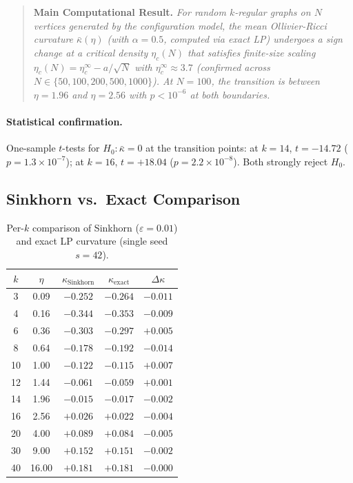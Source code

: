 \documentclass[12pt]{article}
\newcommand{\kbar}{\bar{\kappa}}
\newcommand{\etac}{\eta_c}
\begin{document}
\begin{quotation}
\noindent\textbf{Main Computational Result.} \emph{For random $k$-regular graphs on $N$
vertices generated by the configuration model, the mean Ollivier-Ricci curvature
$\kbar(\eta)$ (with $\alpha = 0.5$, computed via exact LP) undergoes a sign change at a
critical density $\etac(N)$ that satisfies finite-size scaling $\etac(N) = \etac^\infty -
a/\sqrt{N}$ with $\etac^\infty \approx 3.7$ (confirmed across $N \in \{50, 100, 200, 500,
1000\}$). At $N = 100$, the transition is between $\eta = 1.96$ and $\eta = 2.56$ with
$p < 10^{-6}$ at both boundaries.}
\end{quotation}

\paragraph{Statistical confirmation.} One-sample $t$-tests for $H_0\colon \kbar = 0$ at
the transition points: at $k = 14$, $t = -14.72$ ($p = 1.3\times 10^{-7}$); at $k = 16$,
$t = +18.04$ ($p = 2.2\times 10^{-8}$). Both strongly reject $H_0$.

\subsection{Sinkhorn vs.\ Exact Comparison}

\begin{table}[ht]
\centering
\caption{Per-$k$ comparison of Sinkhorn ($\varepsilon = 0.01$) and exact LP curvature
(single seed $s = 42$).}
\label{tab:sinkhorn}
\begin{tabular}{cc ccc}
\toprule
$k$ & $\eta$ & $\kappa_{\mathrm{Sinkhorn}}$ & $\kappa_{\mathrm{exact}}$ & $\Delta\kappa$ \\
\midrule
3  & 0.09  & $-0.252$ & $-0.264$ & $-0.011$ \\
4  & 0.16  & $-0.344$ & $-0.353$ & $-0.009$ \\
6  & 0.36  & $-0.303$ & $-0.297$ & $+0.005$ \\
8  & 0.64  & $-0.178$ & $-0.192$ & $-0.014$ \\
10 & 1.00  & $-0.122$ & $-0.115$ & $+0.007$ \\
12 & 1.44  & $-0.061$ & $-0.059$ & $+0.001$ \\
14 & 1.96  & $-0.015$ & $-0.017$ & $-0.002$ \\
16 & 2.56  & $+0.026$ & $+0.022$ & $-0.004$ \\
20 & 4.00  & $+0.089$ & $+0.084$ & $-0.005$ \\
30 & 9.00  & $+0.152$ & $+0.151$ & $-0.002$ \\
40 & 16.00 & $+0.181$ & $+0.181$ & $-0.000$ \\
\bottomrule
\end{tabular}
\end{table}
\end{document}
